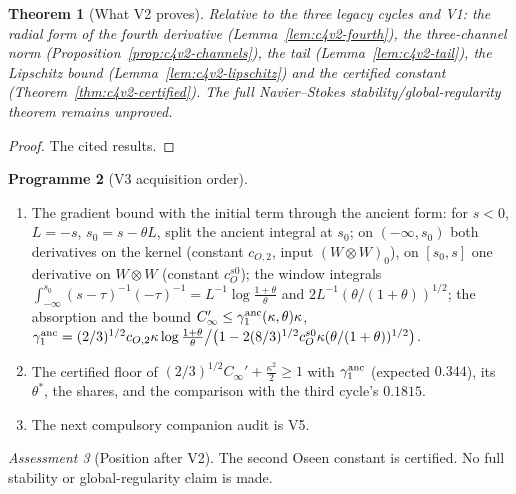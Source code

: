 \documentclass[11pt]{article}
\theoremstyle{plain}
\newtheorem{theorem}{Theorem}[section]
\theoremstyle{definition}
\newtheorem{programme}[theorem]{Programme}
\theoremstyle{remark}
\newtheorem{assessment}[theorem]{Assessment}
\begin{document}
\begin{theorem}[What V2 proves]
\label{thm:c4v2-conclusion}
Relative to the three legacy cycles and V1: the radial form of the
fourth derivative (Lemma~\ref{lem:c4v2-fourth}), the three-channel norm
(Proposition~\ref{prop:c4v2-channels}), the tail (Lemma~\ref{lem:c4v2-tail}),
the Lipschitz bound (Lemma~\ref{lem:c4v2-lipschitz}) and the certified
constant (Theorem~\ref{thm:c4v2-certified}).  The full Navier--Stokes
stability/global-regularity theorem remains unproved.
\end{theorem}

\begin{proof}
The cited results.
\end{proof}

\begin{programme}[V3 acquisition order]
\label{prog:c4v3}
\begin{enumerate}[label=\textup{(AC\arabic*)},leftmargin=4.8em]
\item The gradient bound with the initial term through the ancient
      form: for \(s<0\), \(L=-s\), \(s_0=s-\theta L\), split the ancient integral at
      \(s_0\); on \((-\infty,s_0)\) both derivatives on the kernel (constant
      \(c_{O,2}\), input \((W\otimes W)_0\)), on \([s_0,s]\) one derivative on \(W\otimes W\)
      (constant \(c_O^{s0}\)); the window integrals
      \(\int_{-\infty}^{s_0}(s-\tau)^{-1}(-\tau)^{-1}=L^{-1}\log\frac{1+\theta}\theta\) and \(2L^{-1}(\theta/(1+\theta))^{1/2}\);
      the absorption and the bound
      \(C_\infty'\le\gamma_1^{\rm anc}(\kappa,\theta)\kappa\),
      \(\gamma_1^{\rm anc}=(2/3)^{1/2}c_{O,2}\kappa\log\frac{1+\theta}\theta\big/\bigl(1-2(8/3)^{1/2}c_O^{s0}\kappa(\theta/(1+\theta))^{1/2}\bigr)\).
\item The certified floor of \((2/3)^{1/2}C_\infty'+\frac{\kappa^2}2\ge1\) with
      \(\gamma_1^{\rm anc}\) (expected \(0.344\)), its \(\theta^*\), the shares, and the
      comparison with the third cycle's \(0.1815\).
\item The next compulsory companion audit is V5.
\end{enumerate}
\end{programme}

\begin{assessment}[Position after V2]
\label{ass:c4v2-position}
The second Oseen constant is certified.  No full stability or
global-regularity claim is made.
\end{assessment}

\end{document}
